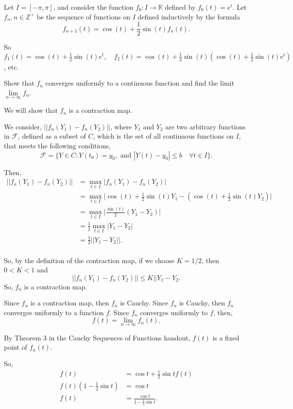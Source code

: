 \documentclass[../hw5]{subfiles}
\begin{document}
Let $I=[-\pi,\pi]$, and consider the function $f_0:I\to \mathbb{R}$ defined by $f_0(t)=e^t$. Let $f_n,n\in\mathbb{Z}^+$ be the sequence of functions on $I$ defined inductively by the formula
\[f_{n+1}(t)=\cos{(t)}+\frac{1}{2}\sin{(t)}f_n(t).\]

So $f_1(t)=\cos{(t)}+\frac{1}{2}\sin{(t)}e^t,\quad f_2(t)=\cos{(t)}+\frac{1}{2}\sin{(t)}\left( \cos{(t)}+\frac{1}{2}\sin{(t)}e^t \right)$, etc.

Show that $f_n$ converges uniformly to a continuous function and find the limit $\lim\limits_{n\to\infty}f_n$.

We will show that $f_n$ is a contraction map. 

We consider, $||f_n(Y_1)-f_n(Y_2)||$, where $Y_1$ and $Y_2$ are two arbitrary functions in $\mathcal{F}$, defined as a subset of $C$, which is the set of all continuous functions on $I$, that meets the following conditions,
\[\mathcal{F}=\{Y\in C : Y(t_0)=y_0, \text{ and } |Y(t)-y_0|\leq b \quad \forall t \in I\}.\]

Then,
\begin{align*}
    ||f_n(Y_1)-f_n(Y_2)||&=\underset{t\in I}{\max}|f_n(Y_1)-f_n(Y_2)|\\
    &=\underset{t\in I}{\max}\Bigg|\cos{(t)}+\frac{1}{2}\sin{(t)}Y_1-\left( \cos{(t)}+\frac{1}{2}\sin{(t)}Y_2 \right)\Bigg|\\
    &=\underset{t\in I}{\max}\Bigg|\frac{\sin{(t)}}{2}(Y_1-Y_2)\Bigg|\\
    &=\frac{1}{2}\underset{t\in I}{\max}\big|Y_1-Y_2\big|\\
    &=\frac{1}{2}||Y_1-Y_2||.\\
\end{align*}

So, by the definition of the contraction map, if we choose $K=1/2$, then $0<K<1$ and
\[||f_n(Y_1)-f_n(Y_2)||\leq K||Y_1-Y_2.\]
So, $f_n$ is a contraction map.

Since $f_n$ is a contraction map, then $f_n$ is Cauchy. Since $f_n$ is Cauchy, then $f_n$ converges uniformly to a function $f$. Since $f_n$ converges uniformly to $f$, then,
\[f(t)=\lim\limits_{n\to\infty}f_n(t).\]


By Theorem 3 in the Cauchy Sequences of Functions handout, $f(t)$ is a fixed point of $f_n(t)$. 

So,
\begin{align*}
    f(t)&=\cos{t}+\frac{1}{2}\sin{t}f(t)\\
    f(t)\left( 1-\frac{1}{2}\sin{t} \right)&=\cos{t}\\
    f(t)&=\frac{\cos{t}}{1-\frac{1}{2}\sin{t}}.\\
\end{align*}
\end{document}
